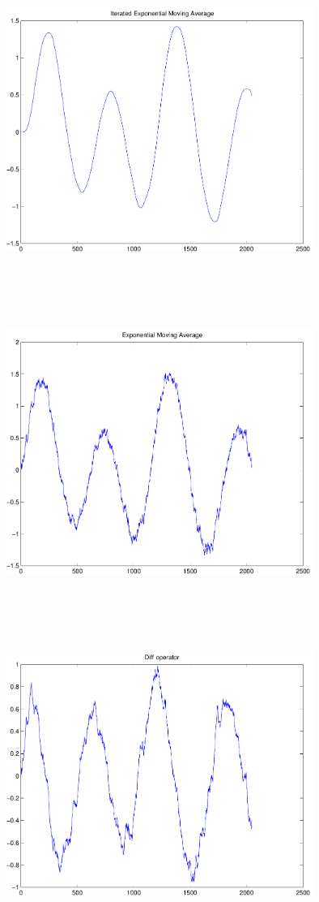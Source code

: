 \documentclass[9pt]{article}
\theoremstyle{plain}
\theoremstyle{definition}
\theoremstyle{remark}
\numberwithin{equation}{section}
\begin{document}
\includegraphics[width=10.0cm,height=10.0cm]{IEMA.pdf}

\includegraphics[width=10.0cm,height=10.0cm]{EMA.pdf}

\includegraphics[width=10.0cm,height=10.0cm]{DIFF.pdf}
\end{document}
